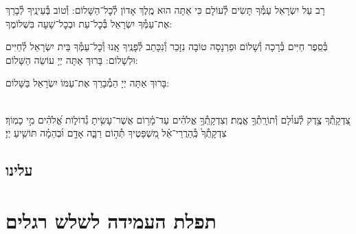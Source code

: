\documentclass[twoside, openany, parskip=half, 11pt]{book}
\begin{document}
\shabboskiddushhayom

\retzeh

\yaalehveyavo

\zion

\modim

\shabboschanukah

\shabboshodos

רָב עַל יִשְׂרָאֵל עַמְּ֯ךָ תָּשִׂים לְ֯עוֹלָם כִּי אַתָּה הוּא מֶֽלֶךְ אָדוֹן לְ֯כׇל־הַשָּׁלוֹם: וְ֯טוֹב בְּ֯עֵינֶֽיךָ לְ֯בָרֵךְ אֶת־עַמְּ֯ךָ יִשְׂרָאֵל בְּ֯כׇל־עֵת וּבְכׇל־שָׁעָה בִּשְׁלוֹמֶךָ:
\vspace{-0.4\baselineskip}
\begin{paracol}{2}

\begin{small}
בְּ֯סֵֽפֶר חַיִּים בְּ֯רָכָה וְ֯שָׁלוֹם וּפַרְנָסָה טוֹבָה נִזָּכֵר וְ֯נִכָּתֵב לְ֯פָנֶֽיךָ אָֽנוּ וְ֯כׇל־עַמְּ֯ךָ בֵּית יִשְׂרָאֵל לְ֯חַיִּים וּלְשָׁלוֹם: בָּרוּךְ אַתָּה יְיָ עוֹשֵׂה הַשָּׁלוֹם:

\end{small}
\switchcolumn
בָּרוּךְ אַתָּה יְיָ הַמְ֯בָרֵךְ אֶת־עַמּוֹ יִשְׂרָאֵל בַּשָּׁלוֹם:

\end{paracol}

\tachanunim

\\
צִ֭דְקָֽתְ֯ךָ צֶ֥דֶק לְ֯עוֹ֗לָם וְ֯תוֹרָֽתְ֯ךָ֥ אֱמֶֽת׃ וְצִדְקָֽתְ֯ךָ֥ אֱלֹהִ֗ים עַד־מָ֫ר֥וֹם אֲשֶׁר־עָשִׂ֥יתָ גְ֯דוֹל֑וֹת אֱ֝לֹהִ֗ים מִ֣י כָמֽוֹךָ׃ צִדְקָֽתְ֯ךָ֙ כְּֽ֯הַרֲרֵי־אֵ֗ל מִ֭שְׁפָּטֶיךָ תְּ֯ה֣וֹם רַבָּ֑ה אָדָ֥ם וּ֜בְהֵמָ֗ה תּוֹשִׁ֥יעַ יְיָ׃

\fullkaddish

\section*{ עלינו }

\aleinu


\chapter[תפלת העמידה לשלש רגלים]{ תפלת העמידה לשלש רגלים }
\label{tefilasregel}

\specialsaavos

\specialsameisim

\end{document}
